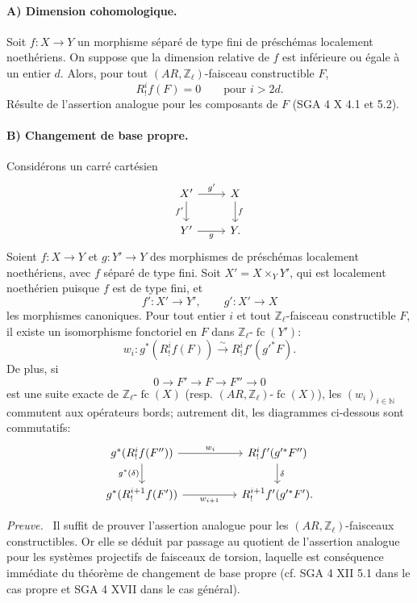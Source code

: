 \documentclass[11pt]{article}
\newenvironment{prooftext}[1][Proof]{\par\noindent\emph{#1.}\ }{\par\medskip}
\providecommand{\fc}{\operatorname{fc}}
\begin{document}
\paragraph{A) Dimension cohomologique.}
Soit \(f:X\to Y\) un morphisme séparé de type fini de préschémas localement noethériens. On suppose que la dimension relative de \(f\) est inférieure ou égale à un entier \(d\). Alors, pour tout \((AR,\mathbb Z_\ell)\)-faisceau constructible \(F\),
\[
R^i_!f(F)=0\qquad\text{pour }i>2d.
\]
Résulte de l'assertion analogue pour les composants de \(F\) (SGA 4 X 4.1 et 5.2).

\paragraph{B) Changement de base propre.}
Considérons un carré cartésien
\[
\begin{tikzcd}
X' \arrow[r,"g'"] \arrow[d,"f'"'] & X \arrow[d,"f"]\\
Y' \arrow[r,"g"'] & Y .
\end{tikzcd}
\]
Soient \(f:X\to Y\) et \(g:Y'\to Y\) des morphismes de préschémas localement noethériens, avec \(f\) séparé de type fini. Soit \(X'=X\times_Y Y'\), qui est localement noethérien puisque \(f\) est de type fini, et
\[
f':X'\to Y',\qquad g':X'\to X
\]
les morphismes canoniques. Pour tout entier \(i\) et tout \(\mathbb Z_\ell\)-faisceau constructible \(F\), il existe un isomorphisme fonctoriel en \(F\) dans \(\mathbb Z_\ell\text{-}\fc(Y')\):
\[
w_i:g^*(R^i_!f(F))\xrightarrow{\sim} R^i_!f'(g'^*F).
\]
De plus, si
\[
0\longrightarrow F'\longrightarrow F\longrightarrow F''\longrightarrow 0
\]
est une suite exacte de \(\mathbb Z_\ell\text{-}\fc(X)\) (resp. \((AR,\mathbb Z_\ell)\text{-}\fc(X)\)), les \((w_i)_{i\in\mathbb N}\) commutent aux opérateurs bords; autrement dit, les diagrammes ci-dessous sont commutatifs:
\[
\begin{tikzcd}[column sep=huge]
g^*(R^i_!f(F'')) \arrow[r,"w_i"] \arrow[d,"g^*(\delta)"']
&
R^i_!f'(g'^*F'') \arrow[d,"\delta"]\\
g^*(R^{i+1}_!f(F')) \arrow[r,"w_{i+1}"']
&
R^{i+1}_!f'(g'^*F').
\end{tikzcd}
\]

\begin{prooftext}[Preuve]
Il suffit de prouver l'assertion analogue pour les \((AR,\mathbb Z_\ell)\)-faisceaux constructibles. Or elle se déduit par passage au quotient de l'assertion analogue pour les systèmes projectifs de faisceaux de torsion, laquelle est conséquence immédiate du théorème de changement de base propre (cf. SGA 4 XII 5.1 dans le cas propre et SGA 4 XVII dans le cas général).
\end{prooftext}
\end{document}
